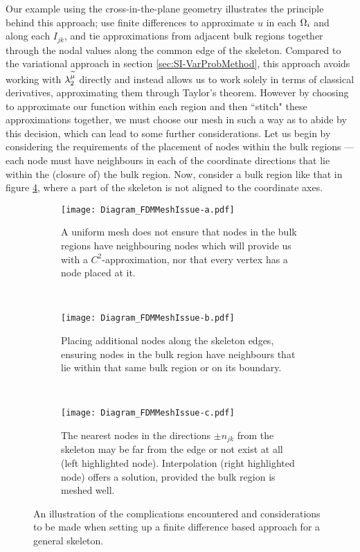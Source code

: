 Our example using the cross-in-the-plane geometry illustrates the principle behind this approach; use finite differences to approximate $u$ in each $\Omega_i$ and along each $I_{jk}$, and tie approximations from adjacent bulk regions together through the nodal values along the common edge of the skeleton.
Compared to the variational approach in section \ref{sec:SI-VarProbMethod}, this approach avoids working with $\lambda_2^{\widetilde{\mu}}$ directly and instead allows us to work solely in terms of classical derivatives, approximating them through Taylor's theorem.
However by choosing to approximate our function within each region and then ``stitch" these approximations together, we must choose our mesh in such a way as to abide by this decision, which can lead to some further considerations.
Let us begin by considering the requirements of the placement of nodes within the bulk regions --- each node must have neighbours in each of the coordinate directions that lie within the (closure of) the bulk region.
Now, consider a bulk region like that in figure \ref{fig:Diagram_FDMMeshIssue}, where a part of the skeleton is not aligned to the coordinate axes.
\begin{figure}[t]
	\centering
	\begin{subfigure}[t]{0.3\textwidth}
		\centering
		\texttt{[image: Diagram\_FDMMeshIssue-a.pdf]}
		\caption{\label{fig:Diagram_FDMMeshIssue-a} A uniform mesh does not ensure that nodes in the bulk regions have neighbouring nodes which will provide us with a $C^2$-approximation, nor that every vertex has a node placed at it.}
	\end{subfigure}
	~
	\begin{subfigure}[t]{0.3\textwidth}
		\centering
		\texttt{[image: Diagram\_FDMMeshIssue-b.pdf]}
		\caption{\label{fig:Diagram_FDMMeshIssue-b} Placing additional nodes along the skeleton edges, ensuring nodes in the bulk region have neighbours that lie within that same bulk region or on its boundary.}
	\end{subfigure}
	~
	\begin{subfigure}[t]{0.3\textwidth}
		\centering
		\texttt{[image: Diagram\_FDMMeshIssue-c.pdf]}
		\caption{\label{fig:Diagram_FDMMeshIssue-c} The nearest nodes in the directions $\pm n_{jk}$ from the skeleton may be far from the edge or not exist at all (left highlighted node). Interpolation (right highlighted node) offers a solution, provided the bulk region is meshed well.}
	\end{subfigure}
	\caption{\label{fig:Diagram_FDMMeshIssue} An illustration of the complications encountered and considerations to be made when setting up a finite difference based approach for a general skeleton.}
\end{figure}
